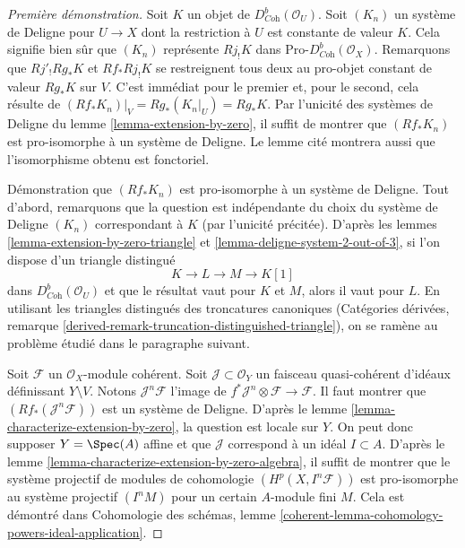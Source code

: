 \begin{proof}[Première démonstration]
Soit $K$ un objet de $D^b_{\textit{Coh}}(\mathcal{O}_U)$. Soit $(K_n)$ un système de Deligne pour $U \to X$ dont la restriction à $U$ est constante de valeur $K$. Cela signifie bien sûr que $(K_n)$ représente $Rj_!K$ dans $\text{Pro-}D^b_{\textit{Coh}}(\mathcal{O}_X)$. Remarquons que $Rj'_!Rg_*K$ et $Rf_*Rj_!K$ se restreignent tous deux au pro-objet constant de valeur $Rg_*K$ sur $V$. C'est immédiat pour le premier et, pour le second, cela résulte de $(Rf_*K_n)|_V = Rg_*(K_n|_U) = Rg_*K$. Par l'unicité des systèmes de Deligne du lemme \ref{lemma-extension-by-zero}, il suffit de montrer que $(Rf_*K_n)$ est pro-isomorphe à un système de Deligne. Le lemme cité montrera aussi que l'isomorphisme obtenu est fonctoriel.

\medskip\noindent
Démonstration que $(Rf_*K_n)$ est pro-isomorphe à un système de Deligne. Tout d'abord, remarquons que la question est indépendante du choix du système de Deligne $(K_n)$ correspondant à $K$ (par l'unicité précitée). D'après les lemmes \ref{lemma-extension-by-zero-triangle} et \ref{lemma-deligne-system-2-out-of-3}, si l'on dispose d'un triangle distingué
$$
K \to L \to M \to K[1]
$$
dans $D^b_{\textit{Coh}}(\mathcal{O}_U)$ et que le résultat vaut pour $K$ et $M$, alors il vaut pour $L$. En utilisant les triangles distingués des troncatures canoniques (Catégories dérivées, remarque \ref{derived-remark-truncation-distinguished-triangle}), on se ramène au problème étudié dans le paragraphe suivant.

\medskip\noindent
Soit $\mathcal{F}$ un $\mathcal{O}_X$-module cohérent. Soit $\mathcal{J} \subset \mathcal{O}_Y$ un faisceau quasi-cohérent d'idéaux définissant $Y \setminus V$. Notons $\mathcal{J}^n\mathcal{F}$ l'image de $f^*\mathcal{J}^n \otimes \mathcal{F} \to \mathcal{F}$. Il faut montrer que $(Rf_*(\mathcal{J}^n\mathcal{F}))$ est un système de Deligne. D'après le lemme \ref{lemma-characterize-extension-by-zero}, la question est locale sur $Y$. On peut donc supposer $Y = \Spec(A)$ affine et que $\mathcal{J}$ correspond à un idéal $I \subset A$. D'après le lemme \ref{lemma-characterize-extension-by-zero-algebra}, il suffit de montrer que le système projectif de modules de cohomologie $(H^p(X, I^n\mathcal{F}))$ est pro-isomorphe au système projectif $(I^n M)$ pour un certain $A$-module fini $M$. Cela est démontré dans Cohomologie des schémas, lemme \ref{coherent-lemma-cohomology-powers-ideal-application}.
\end{proof}

